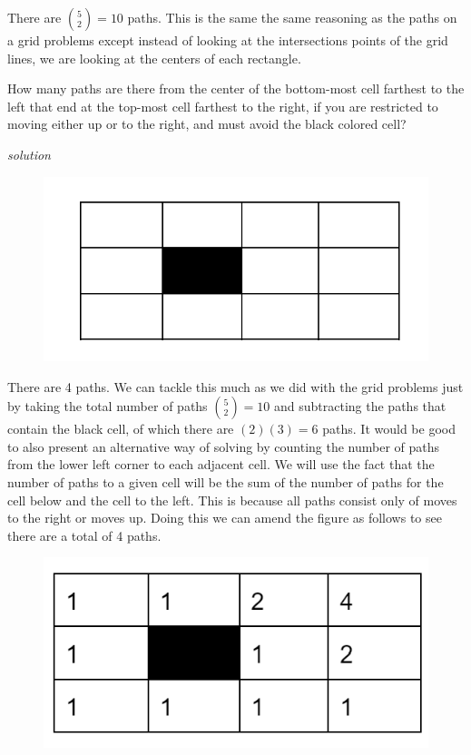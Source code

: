 \documentclass{amsbook}
\begin{document}
\begin{Answer}[ref={c5}]
    There are ${5 \choose 2} =10$ paths. This is the same the same reasoning as the paths on a grid problems except instead of looking at the intersections points of the grid lines, we are looking at the centers of each rectangle.
\end{Answer}

\begin{Exercise}[title={Cell-to-Cell II}, difficulty=1, label=c6]
    How many paths are there from the center of the bottom-most cell farthest to the left that end at the top-most cell farthest to the right, if you are restricted to moving either up or to the right, and must avoid the black colored cell?
    
    \hfill \emph{solution} 
    \begin{figure}[H]
        \includegraphics[width=.4\linewidth]{f.png}
    \end{figure}
\end{Exercise}

\begin{Answer}[ref={c6}]
    There are 4 paths. We can tackle this much as we did with the grid problems just by taking the total number of paths ${5 \choose 2}=10$ and subtracting the paths that contain the black cell, of which there are $(2)(3)=6$ paths. It would be good to also present an alternative way of solving by counting the number of paths from the lower left corner to each adjacent cell. We will use the fact that the number of paths to a given cell will be the sum of the number of paths for the cell below and the cell to the left. This is because all paths consist only of moves to the right or moves up. Doing this we can amend the figure as follows to see there are a total of 4 paths.
        \begin{figure}[H]
            \includegraphics[width=.4\linewidth]{i.png}
        \end{figure}
\end{Answer}
\end{document}
